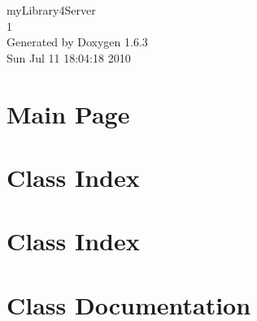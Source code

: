 \documentclass[a4paper]{book}
\begin{document}
\hypersetup{pageanchor=false}
\begin{titlepage}
\vspace*{7cm}
\begin{center}
{\Large myLibrary4Server \\[1ex]\large 1 }\\
\vspace*{1cm}
{\large Generated by Doxygen 1.6.3}\\
\vspace*{0.5cm}
{\small Sun Jul 11 18:04:18 2010}\\
\end{center}
\end{titlepage}
\clearemptydoublepage
{}
\tableofcontents
\clearemptydoublepage
{}
\hypersetup{pageanchor=true}
\chapter{Main Page}
\label{index}\hypertarget{index}{}
\chapter{Class Index}

\chapter{Class Index}

\chapter{Class Documentation}







\printindex
\end{document}
